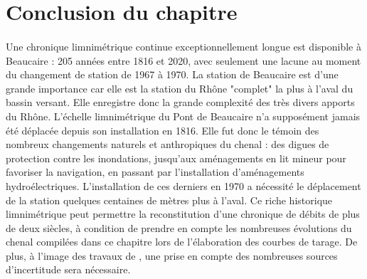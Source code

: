 \FloatBarrier
\section{Conclusion du chapitre}

	\paragraph{} Une chronique limnimétrique continue exceptionnellement longue est disponible à Beaucaire : 205 années entre 1816 et 2020, avec seulement une lacune au moment du changement de station de 1967 à 1970. La station de Beaucaire est d'une grande importance car elle est la station du Rhône "complet" la plus à l'aval du bassin versant. Elle enregistre donc la grande complexité des très divers apports du Rhône. L'échelle limnimétrique du Pont de Beaucaire n'a supposément jamais été déplacée depuis son installation en 1816. Elle fut donc le témoin des nombreux changements naturels et anthropiques du chenal : des digues de protection contre les inondations, jusqu'aux aménagements en lit mineur pour favoriser la navigation, en passant par l'installation d'aménagements hydroélectriques. L'installation de ces derniers en 1970 a nécessité le déplacement de la station quelques centaines de mètres plus à l'aval. Ce riche historique limnimétrique peut permettre la reconstitution d'une chronique de débits de plus de deux siècles, à condition de prendre en compte les nombreuses évolutions du chenal compilées dans ce chapitre lors de l'élaboration des courbes de tarage. De plus, à l'image des travaux de \citet{bard_actualisation_2018}, une prise en compte des nombreuses sources d'incertitude sera nécessaire. 
	

